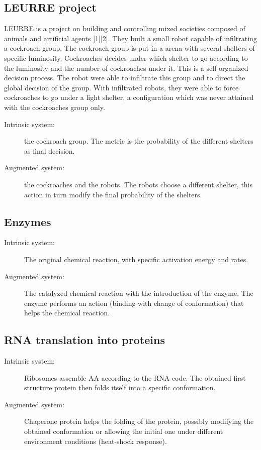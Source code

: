 \documentclass[letterpaper, oneside]{article}
\begin{document}
\subsection{LEURRE project} %
\label{sub:leurre_project}
LEURRE is a project on building and controlling mixed societies composed of animals and artificial agents [1][2]. They built a small robot capable of infiltrating a cockroach group. The cockroach group is put in a arena with several shelters of specific luminosity. Cockroaches decides under which shelter to go according to the luminosity and the number of cockroaches under it. This is a self-organized decision process.
The robot were able to infiltrate this group and to direct the global decision of the group. With infiltrated robots, they were able to force cockroaches to go under a light shelter, a configuration which was never attained with the cockroaches group only.

\begin{description}
	\item[Intrinsic system:] the cockroach group. The metric is the probability of the different shelters as final decision.
	\item[Augmented system:] the cockroaches and the robots. The robots choose a different shelter, this action in turn modify the final probability of the shelters.
\end{description}

\subsection{Enzymes} %
\label{sub:enzymes}
\begin{description}
	\item[Intrinsic system:] The original chemical reaction, with specific activation energy and rates.
	\item[Augmented system:] The catalyzed chemical reaction with the introduction of the enzyme. The enzyme performs an action (binding with change of conformation) that helps the chemical reaction.
\end{description}


\subsection{RNA translation into proteins} %
\label{sub:protein_biosynthesis}
\begin{description}
	\item[Intrinsic system:] Ribosomes assemble AA according to the RNA code. The obtained first structure protein then folds itself into a specific conformation.
	\item[Augmented system:] Chaperone protein helps the folding of the protein, possibly modifying the obtained conformation or allowing the initial one under different environment conditions (heat-shock response).
\end{description}
\end{document}

